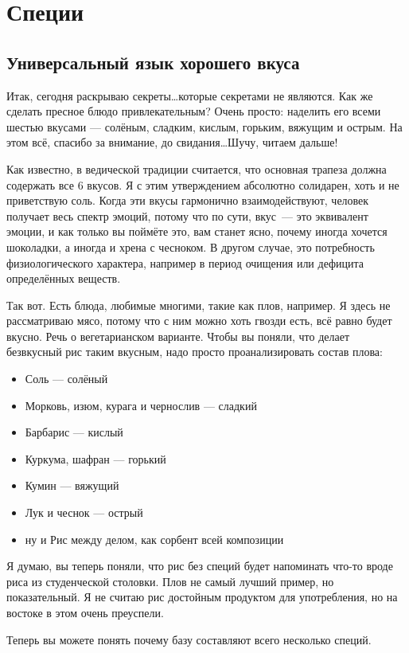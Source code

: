 \chapter{Специи}
\section{Универсальный язык хорошего вкуса}

Итак, сегодня раскрываю секреты\ldots которые секретами не являются.
Как же сделать пресное блюдо привлекательным? 
Очень просто: наделить его всеми шестью вкусами — солёным, сладким, кислым, горьким, вяжущим и острым. На этом всё, спасибо за внимание, до свидания\ldots Шучу, читаем дальше!

Как известно, в ведической традиции считается, что основная трапеза должна содержать все 6 вкусов. Я с этим утверждением абсолютно солидарен, хоть и не приветствую соль. Когда эти вкусы гармонично взаимодействуют, человек получает весь спектр эмоций, потому что по сути, вкус~--- это эквивалент эмоции, и как только вы поймёте это, вам станет ясно, почему иногда хочется шоколадки, а иногда и хрена с чесноком. В другом случае, это потребность физиологического характера, например в период очищения или дефицита определённых веществ.

Так вот. Есть блюда, любимые многими, такие как плов, например. Я здесь не рассматриваю мясо, потому что с ним можно хоть гвозди есть, всё равно будет вкусно. Речь о вегетарианском варианте. Чтобы вы поняли, что делает безвкусный рис таким вкусным, надо просто проанализировать состав плова:
\begin{itemize}
\item Соль — солёный
\item Морковь, изюм, курага и чернослив — сладкий
\item Барбарис — кислый
\item Куркума, шафран — горький
\item Кумин — вяжущий
\item Лук и чеснок — острый
\item ну и Рис между делом, как сорбент всей композиции
\end{itemize}

Я думаю, вы теперь поняли, что рис без специй будет напоминать что-то вроде риса из студенческой столовки. Плов не самый лучший пример, но показательный. Я не считаю рис достойным продуктом для употребления, но на востоке в этом очень преуспели.

Теперь вы можете понять почему базу составляют всего несколько специй.

